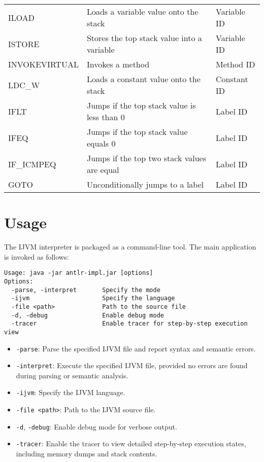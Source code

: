 \documentclass[11pt]{article}
\begin{document}
\begin{table}[H]
{\begin{tabular}{|l|l|l|}
ILOAD           		& Loads a variable value onto the stack             				& Variable ID \\
ISTORE          		& Stores the top stack value into a variable        				& Variable ID \\
INVOKEVIRTUAL & Invokes a method                                  					& Method ID \\
LDC\_W          	& Loads a constant value onto the stack             			& Constant ID \\
IFLT            		& Jumps if the top stack value is less than 0       			& Label ID \\
IFEQ            		& Jumps if the top stack value equals 0             				& Label ID \\
IF\_ICMPEQ      	& Jumps if the top two stack values are equal       			& Label ID \\
GOTO            		& Unconditionally jumps to a label                 				& Label ID \\
\hline
\end{tabular}
}
\end{table}

\section{Usage}
The IJVM interpreter is packaged as a command-line tool. The main application is invoked as follows:

\begin{verbatim}
Usage: java -jar antlr-impl.jar [options]
Options:
  -parse, -interpret       Specify the mode
  -ijvm                    Specify the language
  -file <path>             Path to the source file
  -d, -debug               Enable debug mode
  -tracer                  Enable tracer for step-by-step execution view
\end{verbatim}

\begin{itemize}
    \item \texttt{-parse}: Parse the specified IJVM file and report syntax and semantic errors.
    \item \texttt{-interpret}: Execute the specified IJVM file, provided no errors are found during parsing or semantic analysis.
    \item \texttt{-ijvm}: Specify the IJVM language.
    \item \texttt{-file <path>}: Path to the IJVM source file.
    \item \texttt{-d}, \texttt{-debug}: Enable debug mode for verbose output.
    \item \texttt{-tracer}: Enable the tracer to view detailed step-by-step execution states, including memory dumps and stack contents.
\end{itemize}
\end{document}
